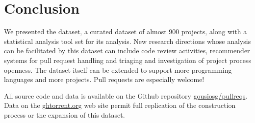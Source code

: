 \documentclass{sig-alternate}
\begin{document}
\section{Conclusion}

We presented the \pullreqs dataset, a curated dataset of almost 900 projects,
along with a statistical analysis tool set for its analysis. New research directions whose analysis can be facilitated
by this dataset can include code review activities, recommender systems for pull
request handling and triaging and investigation of project process openness. The
dataset itself can be extended to support more programming languages and more
projects. Pull requests are especially welcome!

All source code and data is available on the Github repository
\href{https://github.com/gousiosg/pullreqs}{gousiosg/pullreqs}. Data on the
\href{http://ghtorrent.org}{ghtorrent.org} web site permit full replication
of the construction process or the expansion of this dataset.


\balance

  
\end{document}
